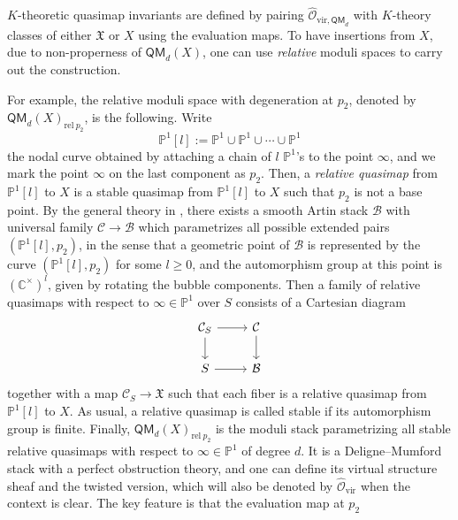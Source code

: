 \documentclass[reqno]{amsart}
\numberwithin{equation}{section}
\numberwithin{equation}{section}
\numberwithin{equation}{section}
\theoremstyle{definition}
\theoremstyle{remark}
\theoremstyle{remark}
\begin{document}
$K$-theoretic quasimap invariants are defined by pairing $\hat{\mathcal{O}}_{\mathrm{vir}, \mathsf{QM}_d}$ with $K$-theory classes of either $\mathfrak{X}$ or $X$ using the evaluation maps. To have insertions from $X$, due to non-properness of $\mathsf{QM}_d(X)$, one can use \emph{relative} moduli spaces to carry out the construction. 

For example, the relative moduli space with degeneration at $p_2$, denoted by $\mathsf{QM}_d(X)_{\mathrm{rel} \  p_2}$, is the following. Write 
\begin{equation}\label{eqn:chain-p-1}
    \mathbb{P}^1[l] := \mathbb{P}^1 \cup \mathbb{P}^1 \cup \cdots \cup \mathbb{P}^1
\end{equation}
the nodal curve obtained by attaching a chain of $l$ $\mathbb{P}^1$'s to the point $\infty$, and we mark the point $\infty$ on the last component as $p_2$. Then, a \emph{relative quasimap} from $\mathbb{P}^1[l]$ to $X$ is a stable quasimap from $\mathbb{P}^1[l]$ to $X$ such that $p_2$ is not a base point. By the general theory in \cite{li-relative}, there exists a smooth Artin stack $\mathcal{B}$ with universal family $\mathcal{C} \to \mathcal{B}$ which parametrizes all possible extended pairs $(\mathbb{P}^1[l], p_2)$, in the sense that a geometric point of $\mathcal{B}$ is represented by the curve $(\mathbb{P}^1[l], p_2)$ for some $l \geq 0$, and the automorphism group at this point is $(\mathbb{C}^{\times})^{l}$, given by rotating the bubble components. Then a family of relative quasimaps with respect to $\infty \in \mathbb{P}^1$ over $S$ consists of a Cartesian diagram
\begin{equation}
    \begin{tikzcd}
\mathcal{C}_S \arrow[r] \arrow[d] & \mathcal{C} \arrow[d] \\
S \arrow[r]                       & \mathcal{B}          
\end{tikzcd}
\end{equation}
together with a map $\mathcal{C}_S \to \mathfrak{X}$ such that each fiber is a relative quasimap from $\mathbb{P}^1[l]$ to $X$. As usual, a relative quasimap is called stable if its automorphism group is finite. Finally, $\mathsf{QM}_d(X)_{\mathrm{rel} \  p_2}$ is the moduli stack parametrizing all stable relative quasimaps with respect to $\infty \in \mathbb{P}^1$ of degree $d$. It is a Deligne--Mumford stack with a perfect obstruction theory, and one can define its virtual structure sheaf and the twisted version, which will also be denoted by $\hat{\mathcal{O}}_{\mathrm{vir}}$ when the context is clear. The key feature is that the evaluation map at $p_2$
\end{document}
